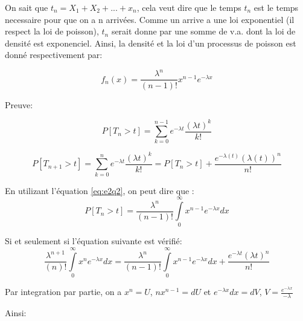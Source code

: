 \documentclass[a4paper]{article}
\begin{document}
On sait que $t_n= X_1 + X_2+ ...+ x_n$, cela veut dire que le temps $t_n$ est le
temps necessaire pour que on a n arrivées. Comme un arrive a une loi exponentiel
(il respect la loi de poisson), $t_n$ serait donne par une somme de v.a. dont la
loi de  densité est exponenciel. Ainsi, la  densité et la loi  d'un processus de
poisson est donné respectivement par:

\begin{equation}
f_n(x)=\frac{\lambda^{n}}{(n-1)!}x^{n-1}e^{-\lambda x}
\end{equation}

Preuve:


\begin{equation} 
P[T_n > t] = \sum_{k=0}^{n-1}e^{-\lambda t}\frac{(\lambda t)^k}{k!}
\end{equation}

\begin{equation}\label{eq:e2q2}
P[T_{n+1} >  t] = \sum_{k=0}^{n}e^{-\lambda t}\frac{(\lambda  t)^k}{k!}= P[T_n >
t]+ \frac{e^{-\lambda (t)}(\lambda (t))^n}{n!}
\end{equation}

En utilizant l'équation \ref{eq:e2q2}, on peut dire que :
\begin{equation} 
P[T_n  > t] =  \frac{\lambda^{n}}{(n-1)!}\int\limits_0^\infty x^{n-1}e^{-\lambda
  x}dx
\end{equation}

Si et seulement si l'équation suivante est vérifié:
\begin{equation} 
\frac{\lambda^{n+1}}{(n)!}\int\limits_0^\infty x^{n}e^{-\lambda
  x}dx = \frac{\lambda^{n}}{(n-1)!}\int\limits_0^\infty x^{n-1}e^{-\lambda
  x}dx +  \frac{e^{-\lambda t}(\lambda t)^n}{n!}
\end{equation}

Par integration  par partie,  on a $  x^n =  U$, $nx^{n-1}=dU$ et  $ e^{-\lambda
  x}dx=dV$, $V=\frac{e^{-\lambda x}}{-\lambda}$

Ainsi:

\end{document}
